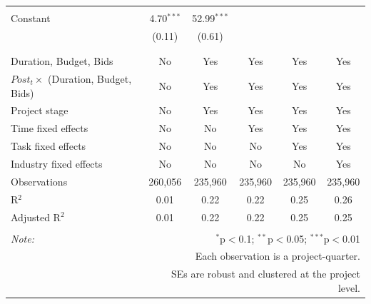 \documentclass[
]{article}
\begin{document}
\begin{table}[H]
\begin{tabular}{@{\extracolsep{-2pt}}lccccc}
  & & & & & \\ 
 Constant & 4.70$^{***}$ & 52.99$^{***}$ &  &  &  \\ 
  & (0.11) & (0.61) &  &  &  \\ 
  & & & & & \\ 
\hline \\[-1.8ex] 
Duration, Budget, Bids & No & Yes & Yes & Yes & Yes \\ 
$Post_t \times $  (Duration, Budget, Bids) & No & Yes & Yes & Yes & Yes \\ 
Project stage & No & Yes & Yes & Yes & Yes \\ 
Time fixed effects & No & No & Yes & Yes & Yes \\ 
Task fixed effects & No & No & No & Yes & Yes \\ 
Industry fixed effects & No & No & No & No & Yes \\ 
Observations & 260,056 & 235,960 & 235,960 & 235,960 & 235,960 \\ 
R$^{2}$ & 0.01 & 0.22 & 0.22 & 0.25 & 0.26 \\ 
Adjusted R$^{2}$ & 0.01 & 0.22 & 0.22 & 0.25 & 0.25 \\ 
\hline 
\hline \\[-1.8ex] 
\textit{Note:}  & \multicolumn{5}{r}{$^{*}$p$<$0.1; $^{**}$p$<$0.05; $^{***}$p$<$0.01} \\ 
 & \multicolumn{5}{r}{Each observation is a project-quarter.} \\ 
 & \multicolumn{5}{r}{SEs are robust and clustered at the project level.} \\ 
\end{tabular} 
\end{table}
\end{document}
